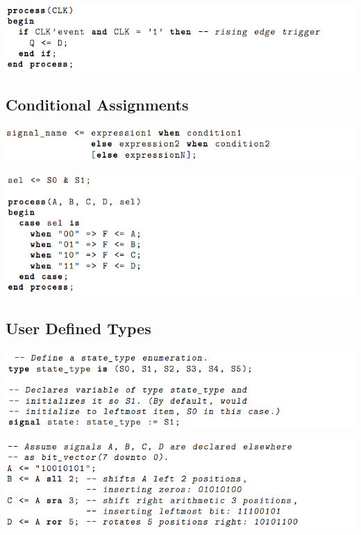 \documentclass[11pt]{article}
\begin{document}
    \begin{center}
        \includegraphics[width=300 px]{flipflops} 
    \end{center} 

    \subsection{Conditional Assignments}

    \begin{center}
        \includegraphics[width=300 px]{condition} 
    \end{center} 

    \begin{center}
        \includegraphics[width=300 px]{case} 
    \end{center} 

    \subsection{User Defined Types} 
    
    \begin{center}
        \includegraphics[width=300 px]{types} 
    \end{center} 

    \begin{center}
        \includegraphics[width=300 px]{shifts} 
    \end{center} 
\end{document}
